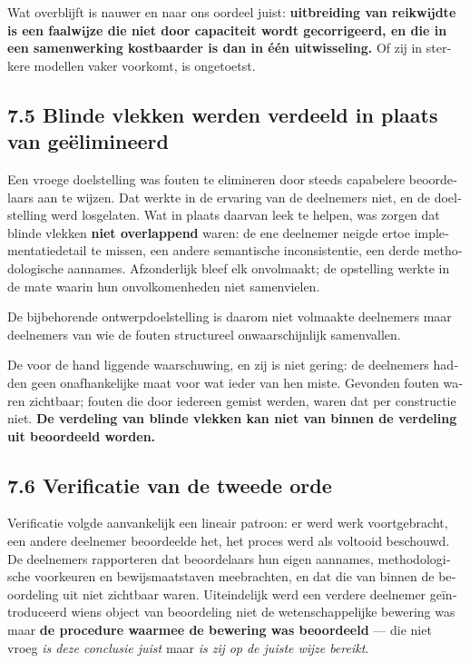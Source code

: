 \begin{dutch}
Wat overblijft is nauwer en naar ons oordeel juist: \textbf{uitbreiding van reikwijdte is een faalwijze die niet door capaciteit wordt gecorrigeerd, en die in een samenwerking kostbaarder is dan in één uitwisseling.} Of zij in sterkere modellen vaker voorkomt, is ongetoetst.


\subsection*{7.5 Blinde vlekken werden verdeeld in plaats van geëlimineerd}
\label{sec:nl:7.5}

Een vroege doelstelling was fouten te elimineren door steeds capabelere beoordelaars aan te wijzen. Dat werkte in de ervaring van de deelnemers niet, en de doelstelling werd losgelaten. Wat in plaats daarvan leek te helpen, was zorgen dat blinde vlekken \textbf{niet overlappend} waren: de ene deelnemer neigde ertoe implementatiedetail te missen, een andere semantische inconsistentie, een derde methodologische aannames. Afzonderlijk bleef elk onvolmaakt; de opstelling werkte in de mate waarin hun onvolkomenheden niet samenvielen.

De bijbehorende ontwerpdoelstelling is daarom niet volmaakte deelnemers maar deelnemers van wie de fouten structureel onwaarschijnlijk samenvallen.

De voor de hand liggende waarschuwing, en zij is niet gering: de deelnemers hadden geen onafhankelijke maat voor wat ieder van hen miste. Gevonden fouten waren zichtbaar; fouten die door iedereen gemist werden, waren dat per constructie niet. \textbf{De verdeling van blinde vlekken kan niet van binnen de verdeling uit beoordeeld worden.}


\subsection*{7.6 Verificatie van de tweede orde}
\label{sec:nl:7.6}

Verificatie volgde aanvankelijk een lineair patroon: er werd werk voortgebracht, een andere deelnemer beoordeelde het, het proces werd als voltooid beschouwd. De deelnemers rapporteren dat beoordelaars hun eigen aannames, methodologische voorkeuren en bewijsmaatstaven meebrachten, en dat die van binnen de beoordeling uit niet zichtbaar waren. Uiteindelijk werd een verdere deelnemer geïntroduceerd wiens object van beoordeling niet de wetenschappelijke bewering was maar \textbf{de procedure waarmee de bewering was beoordeeld} — die niet vroeg \emph{is deze conclusie juist} maar \emph{is zij op de juiste wijze bereikt}.


\end{dutch}
